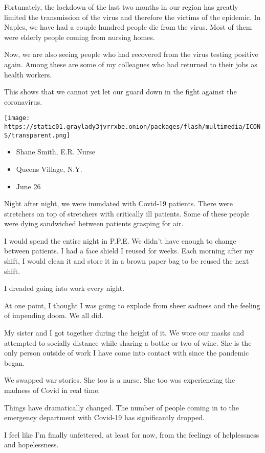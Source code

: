 Fortunately, the lockdown of the last two months in our region has
greatly limited the transmission of the virus and therefore the victims
of the epidemic. In Naples, we have had a couple hundred people die from
the virus. Most of them were elderly people coming from nursing homes.

Now, we are also seeing people who had recovered from the virus testing
positive again. Among these are some of my colleagues who had returned
to their jobs as health workers.

This shows that we cannot yet let our guard down in the fight against
the coronavirus.

\texttt{[image: https://static01.graylady3jvrrxbe.onion/packages/flash/multimedia/ICONS/transparent.png]}

\begin{itemize}
\tightlist
\item
  Shane Smith, E.R. Nurse
\item
  Queens Village, N.Y.
\item
  June 26
\end{itemize}

Night after night, we were inundated with Covid-19 patients. There were
stretchers on top of stretchers with critically ill patients. Some of
these people were dying sandwiched between patients grasping for air.

I would spend the entire night in P.P.E. We didn't have enough to change
between patients. I had a face shield I reused for weeks. Each morning
after my shift, I would clean it and store it in a brown paper bag to be
reused the next shift.

I dreaded going into work every night.

At one point, I thought I was going to explode from sheer sadness and
the feeling of impending doom. We all did.

My sister and I got together during the height of it. We wore our masks
and attempted to socially distance while sharing a bottle or two of
wine. She is the only person outside of work I have come into contact
with since the pandemic began.

We swapped war stories. She too is a nurse. She too was experiencing the
madness of Covid in real time.

Things have dramatically changed. The number of people coming in to the
emergency department with Covid-19 has significantly dropped.

I feel like I'm finally unfettered, at least for now, from the feelings
of helplessness and hopelessness.

